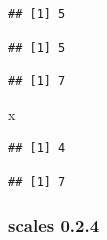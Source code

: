 \documentclass[]{article}
\newenvironment{Shaded}{\begin{snugshade}}{\end{snugshade}}
\newcommand{\KeywordTok}[1]{\textcolor[rgb]{0.13,0.29,0.53}{\textbf{{#1}}}}
\newcommand{\DecValTok}[1]{\textcolor[rgb]{0.00,0.00,0.81}{{#1}}}
\newcommand{\StringTok}[1]{\textcolor[rgb]{0.31,0.60,0.02}{{#1}}}
\newcommand{\CommentTok}[1]{\textcolor[rgb]{0.56,0.35,0.01}{\textit{{#1}}}}
\newcommand{\NormalTok}[1]{{#1}}
\begin{document}
\begin{verbatim}
## [1] 5
\end{verbatim}

\begin{Shaded}
\end{Shaded}

\begin{verbatim}
## [1] 5
\end{verbatim}

\begin{Shaded}
\end{Shaded}

\begin{verbatim}
## [1] 7
\end{verbatim}

\begin{Shaded}
\begin{Highlighting}[]
\NormalTok{x}
\end{Highlighting}
\end{Shaded}

\begin{verbatim}
## [1] 4
\end{verbatim}

\begin{Shaded}
\end{Shaded}

\begin{verbatim}
## [1] 7
\end{verbatim}

\subsubsection{scales 0.2.4}\label{scales-0.2.4}
\end{document}
